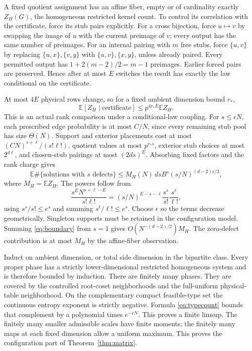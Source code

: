 \documentclass[11pt]{article}
\newcommand{\E}{\mathbb E}
\begin{document}
A fixed quotient assignment has an affine fiber, empty or of cardinality exactly $Z_H(G)$, the homogeneous restricted kernel count. To control its correlation with the certificate, force its stub pairs explicitly. For a cross bijection, force $u\mapsto v$ by swapping the image of $u$ with the current preimage of $v$; every output has the same number of preimages. For an internal pairing with $m$ free stubs, force $\{u,v\}$ by replacing $\{u,x\},\{v,y\}$ with $\{u,v\},\{x,y\}$, unless already paired. Every permitted output has $1+2(m-2)/2=m-1$ preimages. Earlier forced pairs are preserved. Hence after at most $E$ switches the result has exactly the law conditional on the certificate.

At most $4E$ physical rows change, so for a fixed ambient dimension bound $r_*$,
\[
 \E[Z_H\mid\text{certificate}]\le p^{4r_*E}\E Z_H.
\]
This is an actual rank comparison under a conditional-law coupling. For $s\le\epsilon N$, each prescribed edge probability is at most $C/N$, since every remaining stub pool has size $\Theta(N)$. Support and exterior placements cost at most $(C N)^{s+\ell}/(s!\ell!)$, quotient values at most $p^{r_*s}$, exterior stub choices at most $2^{d\ell}$, and chosen-stub pairings at most $(2ds)^E$. Absorbing fixed factors and the rank charge gives
\begin{equation}\label{eq:boundary}
 \E\#\{\text{solutions with }s\text{ defects}\}
 \le M_H(N)\,ds B^s(s/N)^{(d-2)s/2},
\end{equation}
where $M_H=\E Z_H$. The powers follow from
\[
 \frac{s^E N^{s+\ell-E}}{s!\ell!}
 =(s/N)^{E-s-\ell}\frac{s^s}{s!}\frac{s^\ell}{\ell!},
\]
using $s^s/s!\le e^s$ and summing $s^\ell/\ell!\le e^s$. Choose $\epsilon$ so the terms decrease geometrically. Singleton supports must be retained in the configuration model. Summing \eqref{eq:boundary} from $s=1$ gives $O(N^{-(d-2)/2})M_H$. The zero-defect contribution is at most $M_H$ by the affine-fiber observation.

Induct on ambient dimension, or total side dimension in the bipartite class. Every proper phase has a strictly lower-dimensional restricted homogeneous system and is therefore bounded by induction. There are finitely many phases. They are covered by the controlled root-coset neighborhoods and the full-uniform physical-table neighborhood. On the complementary compact feasible-type set the continuous entropy exponent is strictly negative. Formula \eqref{eq:typecount} bounds that complement by a polynomial times $e^{-cN}$. This proves a finite limsup. The finitely many smaller admissible scales have finite moments; the finitely many maps at each fixed dimension allow a uniform maximum. This proves the configuration part of Theorem~\ref{thm:matrix}.
\end{document}
